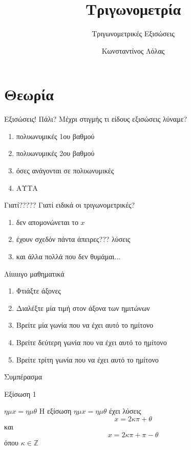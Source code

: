 \documentclass{../presentation}
\title{Τριγωνομετρία}
\subtitle{Τριγωνομετρικές Εξισώσεις}
\author[Λόλας]{Κωνσταντίνος Λόλας}
\date{}
\begin{document}
\begin{frame}
  \titlepage
\end{frame}

\section{Θεωρία}
\begin{frame}{Εξισώσεις! Πάλι?}
  Μέχρι στιγμής τι είδους εξισώσεις λύναμε?
  \begin{enumerate}
    \item<1-> πολυωνυμικές 1ου βαθμού
    \item<2-> πολυωνυμικές 2ου βαθμού
    \item<3-> όσες ανάγονται σε πολυωνυμικές
    \item<4-> ΑΥΤΑ
  \end{enumerate}
\end{frame}

\begin{frame}{Γιατί?????}
  Γιατί ειδικά οι τριγωνομετρικές?
  \begin{enumerate}
    \item<1-> δεν απομονώνεται το $x$
    \item<2-> έχουν σχεδόν πάντα άπειρες??? λύσεις
    \item<3-> και άλλα πολλά που δεν θυμάμαι...
  \end{enumerate}
\end{frame}

\begin{frame}{Λίιιιιιγο μαθηματικά}
  \begin{enumerate}
    \item<1-> Φτιάξτε άξονες
    \item<2-> Διαλέξτε μία τιμή στον άξονα των ημιτώνων
    \item<3-> Βρείτε μία γωνία που να έχει αυτό το ημίτονο
    \item<4-> Βρείτε δεύτερη γωνία που να έχει αυτό το ημίτονο
    \item<5-> Βρείτε τρίτη γωνία που να έχει αυτό το ημίτονο
  \end{enumerate}
   Συμπέρασμα

\end{frame}

\begin{frame}{Εξίσωση 1}
  \begin{block}{$ημx=ημθ$}
    Η εξίσωση $ημx=ημθ$ έχει λύσεις
    $$x=2κπ+θ$$
    και
    $$x=2κπ+π-θ$$
    όπου $κ\in\mathbb{Z}$
  \end{block}
\end{frame}
\end{document}
